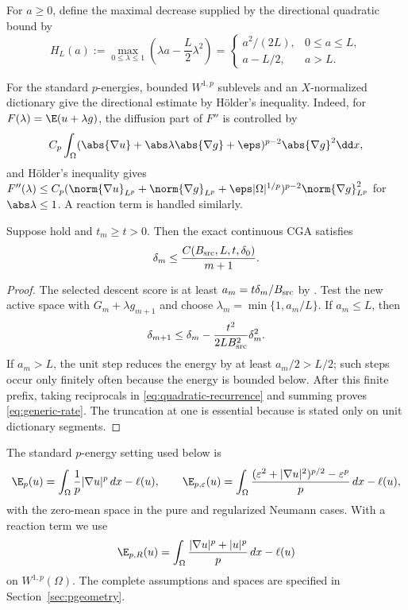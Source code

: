 For $a\geq0$, define the maximal decrease supplied by the directional quadratic
bound by
\[
 H_L(a):=\max_{0\leq\lambda\leq1}
       \left(\lambda a-\frac L2\lambda^2\right)
 =\begin{cases}a^2/(2L),&0\leq a\leq L,\\
                 a-L/2,&a>L.
   \end{cases}
\]

For the standard \(p\)-energies, bounded \(W^{1,p}\) sublevels and an \(X\)-normalized dictionary give the directional estimate by H\"older's inequality. Indeed, for
\(F(\lambda)=\E(u+\lambda g)\), the diffusion part of \(F''\) is controlled by
\[
 C_p\int_\Omega(\abs{\nabla u}+\abs\lambda\abs{\nabla g}+\eps)^{p-2}
 \abs{\nabla g}^2\dd x,
\]
and H\"older's inequality gives
\(F''(\lambda)\leq C_p(\norm{\nabla u}_{L^p}+\norm{\nabla g}_{L^p}+\eps|\Omega|^{1/p})^{p-2}
\norm{\nabla g}_{L^p}^2\) for \(\abs\lambda\leq1\). A reaction term is handled similarly.

\begin{theorem}
\label{thm:generic}
Suppose  hold and \(t_m\geq t>0\). Then the exact continuous CGA
satisfies
\begin{equation}
  \delta_m\leq \frac{C(B_{\rm src},L,t,\delta_0)}{m+1}.
\label{eq:generic-rate}
\end{equation}
\end{theorem}

\begin{proof}
The selected descent score is at least \(a_m=t\delta_m/B_{\rm src}\) by . Test the new
active space with \(G_m+\lambda g_{m+1}\) and choose
\(\lambda_m=\min\{1,a_m/L\}\). If \(a_m\leq L\), then
\begin{equation}
 \delta_{m+1}\leq\delta_m-\frac{t^2}{2LB_{\rm src}^2}\delta_m^2.
\label{eq:quadratic-recurrence}
\end{equation}
If \(a_m>L\), the unit step reduces the energy by at least \(a_m/2>L/2\); such steps occur only
finitely often because the energy is bounded below. After this finite prefix, taking reciprocals in
\cref{eq:quadratic-recurrence} and summing proves \cref{eq:generic-rate}. The truncation at one is
essential because  is stated only on unit dictionary segments.
\end{proof}

The standard $p$-energy setting used below is
\[
 \E_p(u)=\int_\Omega \frac1p|\nabla u|^p\,dx-\ell(u),\qquad
 \E_{p,\varepsilon}(u)=\int_\Omega
 \frac{(\varepsilon^2+|\nabla u|^2)^{p/2}-\varepsilon^p}{p}\,dx-\ell(u),
\]
with the zero-mean space in the pure and regularized Neumann cases. With a reaction
term we use
\[
 \E_{p,R}(u)=\int_\Omega\frac{|\nabla u|^p+|u|^p}{p}\,dx-\ell(u)
\]
on $W^{1,p}(\Omega)$. The complete assumptions and spaces are specified in
Section~\ref{sec:pgeometry}.

